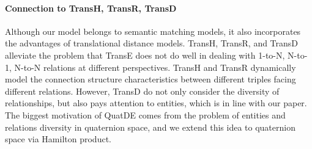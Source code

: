 \documentclass[letterpaper]{article} \usepackage{aaai20}  \usepackage{times}  \usepackage{helvet} \usepackage{courier}  \usepackage[hyphens]{url}  \usepackage{graphicx} \usepackage{lineno,hyperref,amsmath,amssymb}
\begin{document}
\paragraph{\textbf{Connection to TransH, TransR, TransD}}Although our model belongs to semantic matching models, it also incorporates the advantages of translational distance models. TransH, TransR, and TransD alleviate the problem that TransE does not do well in dealing with 1-to-N, N-to-1, N-to-N relations at different perspectives. TransH and TransR dynamically model the connection structure characteristics between different triples facing different relations. However, TransD do not only consider the diversity of relationships, but also pays attention to entities, which is in line with our paper. The biggest motivation of QuatDE comes from the problem of entities and relations diversity in quaternion space, and we extend this idea to quaternion space via Hamilton product.
\end{document}
